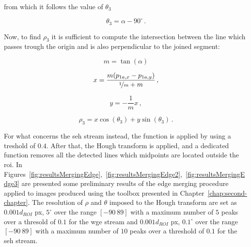 from which it follows the value of $\theta_3$

\begin{equation}
  \theta_3 = \alpha - 90^{\circ} \,.
\end{equation}

Now, to find $\rho_3$ it is sufficient to compute the intersection between the line which passes trough the origin and is also perpendicular to the joined segment:

\begin{equation}
  m = \tan(\alpha)
\end{equation}

\begin{equation}
  x = \frac{m(p_{1a,x}-p_{1a,y})}{\nicefrac{1}{m} + m} \,,
\end{equation}

\begin{equation}
  y = - \frac{1}{m} x \,,
\end{equation}

\begin{equation}
  \rho_3 = x \cos (\theta_3) +  y \sin (\theta_3) \,.
\end{equation}

For what concerns the \acrshort{seh} stream instead, the  function is applied by using a treshold of $0.4$. After that, the Hough transform is applied, and a dedicated function removes all the detected lines which midpoints are located outside the \acrshort{roi}.
In Figures~\ref{fig:resultsMergingEdge},~\ref{fig:resultsMergingEdge2},~\ref{fig:resultsMergingEdge3} are presented some preliminary results of the edge merging procedure applied to images produced using the toolbox presented in Chapter~\ref{chap:second-chapter}. The resolution of $\rho$ and $\theta$ imposed to the Hough transform are set as $0.001 d_{ROI}$ px, $5^\circ$ over the range $[-90 \ 89]$ with a maximum number of $5$ peaks over a thresold of $0.1$ for the \acrshort{wge} stream and $0.001 d_{ROI}$ px, $0.1^\circ$ over the range $[-90 \ 89]$ with a maximum number of $10$ peaks over a threshold of $0.1$ for the \acrshort{seh} stream.

